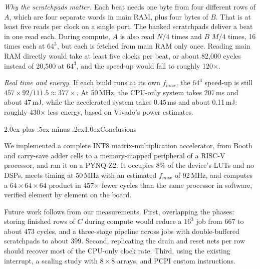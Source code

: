 \documentclass[10pt,twocolumn,a4paper]{article}
\makeatletter
\renewcommand\section{\@startsection{section}{1}{\z@}%
  {2.0ex plus .5ex minus .2ex}{1.0ex}{\centering\normalfont\scshape}}
\makeatother
\begin{document}
\emph{Why the scratchpads matter.} Each beat needs one byte from four
different rows of $A$, which are four separate words in main RAM, plus four
bytes of $B$. That is at least five reads per clock on a single port. The banked
scratchpads deliver a beat in one read each. During compute, $A$ is also read
$N/4$ times and $B$ $M/4$ times, 16 times each at $64^3$, but each is fetched
from main RAM only once. Reading main RAM directly would take at least five
clocks per beat, or about 82,000 cycles instead of 20,500 at $64^3$, and the
speed-up would fall to roughly 120$\times$.

\emph{Real time and energy.} If each build runs at its own $f_{max}$, the
$64^3$ speed-up is still $457\times92/111.5\approx377\times$. At 50\,MHz, the
CPU-only system takes 207\,ms and about 47\,mJ, while the accelerated system
takes 0.45\,ms and about 0.11\,mJ: roughly 430$\times$ less energy, based on
Vivado's power estimates.

\section{Conclusions}\label{sec:concl}

We implemented a complete INT8 matrix-multiplication accelerator, from Booth
and carry-save adder cells to a memory-mapped peripheral of a RISC-V
processor, and ran it on a PYNQ-Z2. It occupies 8\% of the device's LUTs and no
DSPs, meets timing at 50\,MHz with an estimated $f_{max}$ of 92\,MHz, and computes a
$64\times64\times64$ product in 457$\times$ fewer cycles than the same processor
in software, verified element by element on the board.

Future work follows from our measurements. First, overlapping the phases:
storing finished rows of $C$ during compute would reduce a $16^3$ job from 667
to about 473 cycles, and a three-stage pipeline across jobs with
double-buffered scratchpads to about 399. Second, replicating the drain and
reset nets per row should recover most of the CPU-only clock rate. Third,
using the existing interrupt, a scaling study with $8\times8$ arrays, and PCPI
custom instructions.
\end{document}
